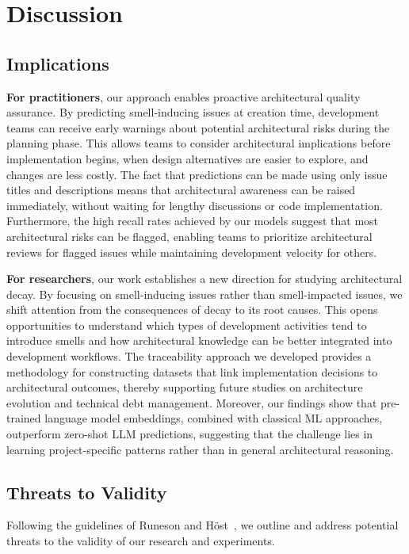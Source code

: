 \section{Discussion}
\label{s:discussion}
\subsection{Implications}


\textbf{For practitioners}, our approach enables proactive architectural quality assurance.
By predicting smell-inducing issues at creation time, development teams can receive early warnings about potential architectural risks during the planning phase.
This allows teams to consider architectural implications before implementation begins, when design alternatives are easier to explore, and changes are less costly.
The fact that predictions can be made using only issue titles and descriptions means that architectural awareness can be raised immediately, without waiting for lengthy discussions or code implementation.
Furthermore, the high recall rates achieved by our models suggest that most architectural risks can be flagged, enabling teams to prioritize architectural reviews for flagged issues while maintaining development velocity for others.

\textbf{For researchers}, our work establishes a new direction for studying architectural decay.
By focusing on smell-inducing issues rather than smell-impacted issues, we shift attention from the consequences of decay to its root causes.
This opens opportunities to understand which types of development activities tend to introduce smells and how architectural knowledge can be better integrated into development workflows.
The traceability approach we developed provides a methodology for constructing datasets that link implementation decisions to architectural outcomes, thereby supporting future studies on architecture evolution and technical debt management.
Moreover, our findings show that pre-trained language model embeddings, combined with classical ML approaches, outperform zero-shot LLM predictions, suggesting that the challenge lies in learning project-specific patterns rather than in general architectural reasoning.

\subsection{Threats to Validity}
Following the guidelines of Runeson and Höst~\cite{runeson_guidelines_2008}, we outline and address potential threats to the validity of our research and experiments.

